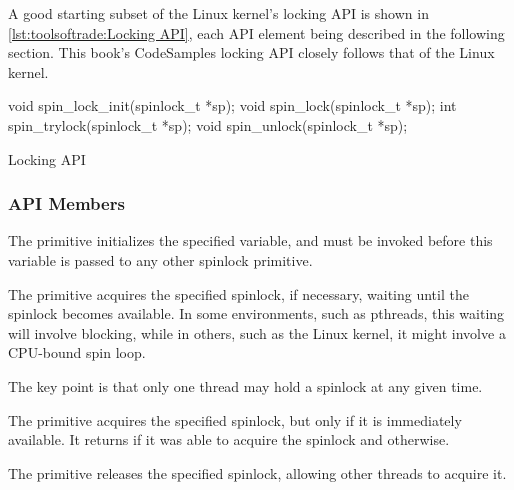 A good starting subset of the Linux kernel's locking API is shown in
\cref{lst:toolsoftrade:Locking API},
each API element being described in the following section.
This book's CodeSamples locking API closely follows that of the Linux kernel.

\begin{listing}
\begin{VerbatimL}[numbers=none]
void spin_lock_init(spinlock_t *sp);
void spin_lock(spinlock_t *sp);
int spin_trylock(spinlock_t *sp);
void spin_unlock(spinlock_t *sp);
\end{VerbatimL}
\caption{Locking API}
\label{lst:toolsoftrade:Locking API}
\end{listing}

\subsubsection{API Members}

\begin{description}[style=nextline]

\item[\tco{spin_lock_init()}]
The  primitive initializes the specified
 variable, and must be invoked before
this variable is passed to any other spinlock primitive.

\item[\tco{spin_lock()}]
The  primitive acquires the specified spinlock,
if necessary, waiting until the spinlock becomes available.
In some environments, such as pthreads, this waiting will involve
blocking, while in others, such as the Linux kernel, it might involve
a CPU-bound spin loop.

The key point is that only one thread may hold a spinlock at any
given time.

\item[\tco{spin_trylock()}]
The  primitive acquires the specified spinlock,
but only if it is immediately available.
It returns  if it was able to acquire the spinlock and
 otherwise.

\item[\tco{spin_unlock()}]
The  primitive releases the specified spinlock,
allowing other threads to acquire it.

\end{description}



